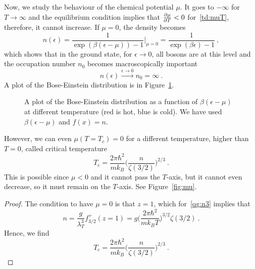     Now, we study the behaviour of the chemical potential $\mu$. It goes to $-\infty$ for $T \rightarrow \infty$ and  the equilibrium condition implies that $\frac{\partial\mu}{\partial T} < 0$ for~\eqref{td:muT}, therefore, it cannot increase. If $\mu = 0$, the density becomes 
    \begin{equation*}
        n(\epsilon) = \frac{1}{\exp(\beta(\epsilon - \mu)) - 1} \Big \vert_{\mu = 0} = \frac{1}{\exp(\beta \epsilon) - 1} ~,
    \end{equation*}
    which shows that in the ground state, for $\epsilon \rightarrow 0$, all bosons are at this level and the occupation number $n_0$ becomes macroscopically important
    \begin{equation}\label{ninf}
        n(\epsilon) \xrightarrow{\epsilon \rightarrow 0} n_0 =\infty ~.
    \end{equation}
    A plot of the Bose-Einstein distribution is in Figure~\ref{fig:be}.
    \begin{figure}
        \centering
        \caption{A plot of the Bose-Einstein distribution as a function of $\beta (\epsilon - \mu)$ at different temperature (red is hot, blue is cold). We have used $\beta (\epsilon - \mu)$ and $f(x) = n$.}
        \label{fig:be}
    \end{figure}
    However, we can even $\mu(T=T_c) = 0$ for a different temperature, higher than $T=0$, called critical temperature 
    \begin{equation*}
        T_c = \frac{2 \pi \hbar^2}{m k_B} \Big ( \frac{n}{\zeta(3/2)} \Big)^{2/3} ~.
    \end{equation*}
    This is possible since $\mu < 0$ and it cannot pass the $T$-axis, but it cannot even decrease, so it must remain on the $T$-axis. See Figure~\eqref{fig:mu}. 
    \begin{proof}
        The condition to have $\mu = 0$ is that $z = 1$, which for~\eqref{qg:n3} implies that 
        \begin{equation*}
            n = \frac{g}{\lambda_T^3} f^+_{3/2} (z=1) = g \Big (\frac{2 \pi \hbar^2}{m k_B T} \Big)^{3/2} \zeta(3/2) ~.
        \end{equation*}
        Hence, we find
        \begin{equation*}
            T_c = \frac{2 \pi \hbar^2}{m k_B} \Big ( \frac{n}{\zeta(3/2)} \Big)^{2/3} ~.
        \end{equation*}
    \end{proof}
